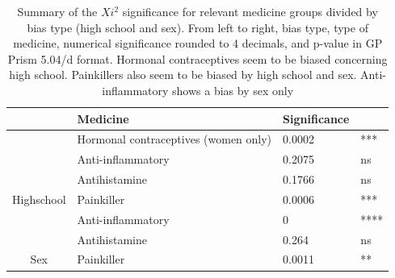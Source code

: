     
    \begin{table}
    
        \caption{Summary of the $Xi^2$ significance for relevant medicine groups divided by bias type (high school and sex). From left to right, bias type, type of medicine, numerical significance rounded to 4 decimals, and p-value in GP Prism 5.04/d format. Hormonal contraceptives seem to be biased concerning high school. Painkillers also seem to be biased by high school and sex. Anti-inflammatory shows a bias by sex only}
        
        \centering
        
        \begin{tabular}{clll}
        
            \rowcolor[rgb]{1,1,0.78} \multicolumn{1}{l}{Bias type}       & Medicine                             & Significance &       \\ 
            \hline
            {\cellcolor[rgb]{1,0.808,0.576}}                             & Hormonal contraceptives (women only) & 0.0002       & ***   \\
            {\cellcolor[rgb]{1,0.808,0.576}}                             & Anti-inflammatory                    & 0.2075       & ns    \\
            {\cellcolor[rgb]{1,0.808,0.576}}                             & Antihistamine                        & 0.1766       & ns    \\
            \multirow{-4}{*}{{\cellcolor[rgb]{1,0.808,0.576}}Highschool} & Painkiller                           & 0.0006       & ***   \\ 
            \hline
            {\cellcolor[rgb]{0.925,0.957,1}}                             & Anti-inflammatory                    & 0            & ****  \\
            {\cellcolor[rgb]{0.925,0.957,1}}                             & Antihistamine                        & 0.264        & ns    \\
            \multirow{-3}{*}{{\cellcolor[rgb]{0.925,0.957,1}}Sex}        & Painkiller                           & 0.0011       & **   
            
        \end{tabular}
        
        \label{table:Results4XiSummary}
        
    \end{table}

